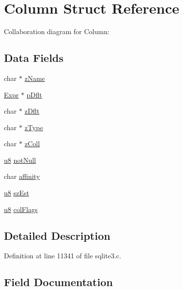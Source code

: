 \hypertarget{struct_column}{}\section{Column Struct Reference}
\label{struct_column}


Collaboration diagram for Column\+:
\subsection*{Data Fields}
\begin{DoxyCompactItemize}
\item 
char $\ast$ \hyperlink{struct_column_a661118d86ac4127d40bf3be78d92117d}{z\+Name}
\item 
\hyperlink{struct_expr}{Expr} $\ast$ \hyperlink{struct_column_ae517aa21ac9c2666eb015bb57c8f9362}{p\+Dflt}
\item 
char $\ast$ \hyperlink{struct_column_a71f007e8ffe748cdf38ca3aa9ee16c5f}{z\+Dflt}
\item 
char $\ast$ \hyperlink{struct_column_a9c37cde19d475c63f750798ff6cdeeb1}{z\+Type}
\item 
char $\ast$ \hyperlink{struct_column_a262c87d8fe493531ec15e58fb8b66f8c}{z\+Coll}
\item 
\hyperlink{sqlite3_8c_a74a0f6424ae628af25f23f0a35f6ead3}{u8} \hyperlink{struct_column_ac0fa1e50277175a94fd8bb1ccf7c18d8}{not\+Null}
\item 
char \hyperlink{struct_column_a58ce1ac60212fdb49de8a3029209e9e2}{affinity}
\item 
\hyperlink{sqlite3_8c_a74a0f6424ae628af25f23f0a35f6ead3}{u8} \hyperlink{struct_column_a6a9078b6732e33d101983427e2eea7a9}{sz\+Est}
\item 
\hyperlink{sqlite3_8c_a74a0f6424ae628af25f23f0a35f6ead3}{u8} \hyperlink{struct_column_a5ff43f1aaa8353fcb6de565eac956e76}{col\+Flags}
\end{DoxyCompactItemize}


\subsection{Detailed Description}


Definition at line 11341 of file sqlite3.\+c.



\subsection{Field Documentation}
\hypertarget{struct_column_a58ce1ac60212fdb49de8a3029209e9e2}{}

